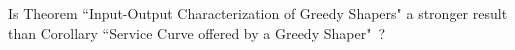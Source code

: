 \begin{problem}
        Is Theorem ``Input-Output Characterization of Greedy Shapers" a stronger result
        than Corollary ``Service Curve offered by a Greedy Shaper"~?
\end{problem}
